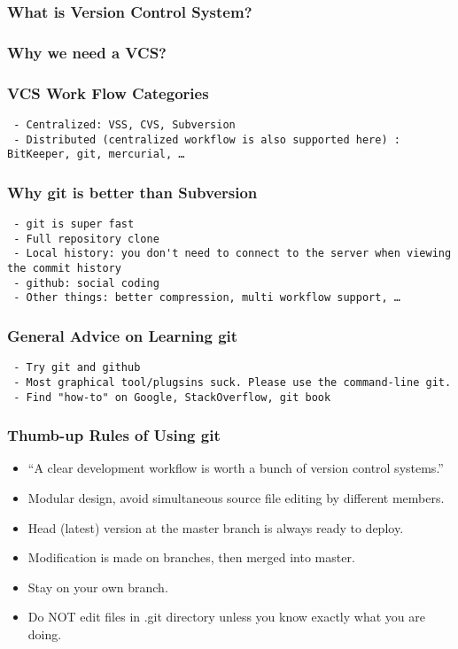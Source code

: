 \begin{frame}\frametitle{What is Version Control System?}

\end{frame}

\begin{frame}\frametitle{Why we need a VCS?}

\end{frame}

\begin{frame}[fragile]\frametitle{VCS Work Flow Categories}

\begin{verbatim}
 - Centralized: VSS, CVS, Subversion
 - Distributed (centralized workflow is also supported here) : BitKeeper, git, mercurial, …
\end{verbatim}
\end{frame}

\begin{frame}[fragile]\frametitle{Why git is better than Subversion}

\begin{verbatim}
 - git is super fast
 - Full repository clone
 - Local history: you don't need to connect to the server when viewing the commit history
 - github: social coding
 - Other things: better compression, multi workflow support, …
\end{verbatim}
\end{frame}

\begin{frame}[fragile]\frametitle{General Advice on Learning git}

\begin{verbatim}
 - Try git and github 
 - Most graphical tool/plugsins suck. Please use the command-line git.
 - Find "how-to" on Google, StackOverflow, git book
\end{verbatim}
\end{frame}

\begin{frame}\frametitle{Thumb-up Rules of Using git}

\begin{itemize}
\item
  ``A clear development workflow is worth a bunch of version control
  systems.''
\item
  Modular design, avoid simultaneous source file editing by different
  members.
\item
  Head (latest) version at the master branch is always ready to deploy.
\item
  Modification is made on branches, then merged into master.
\item
  Stay on your own branch.
\item
  Do NOT edit files in .git directory unless you know exactly what you
  are doing. 
\end{itemize}
\end{frame}

